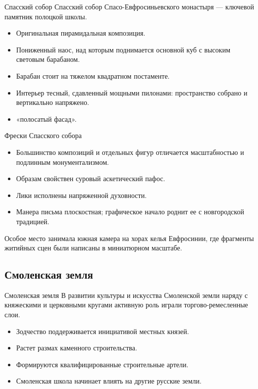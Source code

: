 \begin{frame}{Спасский собор}
  Спасский собор Спасо-Евфросиньевского монастыря --- ключевой
  памятник полоцкой школы.
  \begin{itemize}
    \item Оригинальная пирамидальная композиция.
    \item Пониженный наос, над которым поднимается основной куб
          с высоким световым барабаном.
    \item Барабан стоит на тяжелом квадратном постаменте.
    \item Интерьер тесный, сдавленный мощными пилонами:
          пространство собрано и вертикально напряжено.
    \item «полосатый фасад».
  \end{itemize}
\end{frame}

\begin{frame}{Фрески Спасского собора}
  \begin{itemize}
    \item Большинство композиций и отдельных фигур отличается
          масштабностью и подлинным монументализмом.
    \item Образам свойствен суровый аскетический пафос.
    \item Лики исполнены напряженной духовности.
    \item Манера письма плоскостная; графическое начало роднит ее
          с новгородской традицией.
  \end{itemize}
  Особое место занимала южная камера на хорах келья Евфросинии,
  где фрагменты житийных сцен были написаны в миниатюрном масштабе.
\end{frame}

\subsection{Смоленская земля}

\begin{frame}{Смоленская земля}
  В развитии культуры и искусства Смоленской земли наряду с княжескими
  и церковными кругами активную роль играли торгово-ремесленные слои.
  \begin{itemize}
    \item Зодчество поддерживается инициативой местных князей.
    \item Растет размах каменного строительства.
    \item Формируются квалифицированные строительные артели.
    \item Смоленская школа начинает влиять на другие русские земли.
  \end{itemize}
\end{frame}

